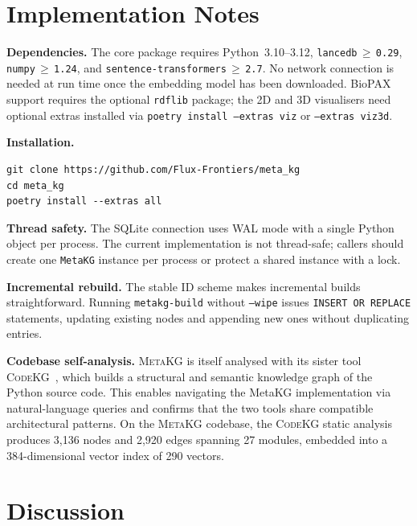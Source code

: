 \documentclass[10pt]{article}
\begin{document}
\section{Implementation Notes}
\label{sec:impl}

\textbf{Dependencies.} The core package requires Python~3.10--3.12,
\texttt{lancedb$\,\geq\,$0.29}, \texttt{numpy$\,\geq\,$1.24}, and
\texttt{sentence-transformers$\,\geq\,$2.7}. No network connection is needed
at run time once the embedding model has been downloaded. BioPAX support
requires the optional \texttt{rdflib} package; the 2D and 3D visualisers
need optional extras installed via \texttt{poetry install --extras viz}
or \texttt{--extras viz3d}.

\textbf{Installation.}

\begin{lstlisting}[style=bash]
git clone https://github.com/Flux-Frontiers/meta_kg
cd meta_kg
poetry install --extras all
\end{lstlisting}

\textbf{Thread safety.} The SQLite connection uses WAL mode with a single
Python object per process. The current implementation is not thread-safe;
callers should create one \texttt{MetaKG} instance per process or protect a
shared instance with a lock.

\textbf{Incremental rebuild.} The stable ID scheme makes incremental builds
straightforward. Running \texttt{metakg-build} without \texttt{--wipe} issues
\texttt{INSERT OR REPLACE} statements, updating existing nodes and appending
new ones without duplicating entries.

\textbf{Codebase self-analysis.} \textsc{MetaKG} is itself analysed with its
sister tool \textsc{CodeKG}~\citep{fluxfrontiers2025codekg}, which builds a
structural and semantic knowledge graph of the Python source code. This
enables navigating the MetaKG implementation via natural-language queries and
confirms that the two tools share compatible architectural patterns. On the
\textsc{MetaKG} codebase, the \textsc{CodeKG} static analysis produces 3,136
nodes and 2,920 edges spanning 27 modules, embedded into a 384-dimensional
vector index of 290 vectors.

\section{Discussion}
\label{sec:discussion}
\end{document}
